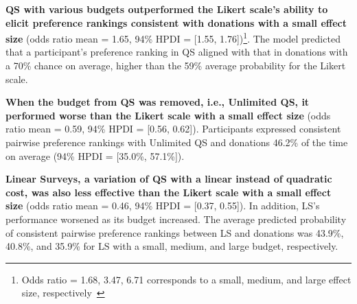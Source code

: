 \textbf{QS with various budgets outperformed the Likert scale's ability to elicit preference rankings consistent with donations with a small effect size} (odds ratio mean = 1.65, 94\% HPDI = [1.55, 1.76])\footnote{Odds ratio = 1.68, 3.47, 6.71 corresponds to a small, medium, and large effect size, respectively~\cite{chen2010big}}. The model predicted that a participant's preference ranking in QS aligned with that in donations with a 70\% chance on average, higher than the 59\% average probability for the Likert scale. 

\textbf{When the budget from QS was removed, i.e., Unlimited QS, it performed worse than the Likert scale with a small effect size} (odds ratio mean = 0.59, 94\% HPDI = [0.56, 0.62]). Participants expressed consistent pairwise preference rankings with Unlimited QS and donations 46.2\% of the time on average (94\% HPDI = [35.0\%, 57.1\%]). 

\textbf{Linear Surveys, a variation of QS with a linear instead of quadratic cost, was also less effective than the Likert scale with a small effect size} (odds ratio mean = 0.46, 94\% HPDI = [0.37, 0.55]). In addition, LS's performance worsened as its budget increased. The average predicted probability of consistent pairwise preference rankings between LS and donations was 43.9\%, 40.8\%, and 35.9\% for LS with a small, medium, and large budget, respectively.  